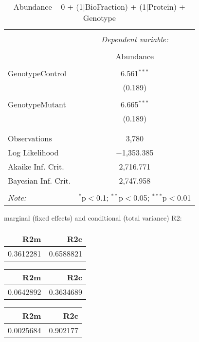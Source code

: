 \documentclass[11pt]{report}
\begin{document}
\begin{table}[!htbp] \centering 
  \caption{Abundance ~ 0 + (1|BioFraction) + (1|Protein) + Genotype} 
  \label{} 
\begin{tabular}{@{\extracolsep{5pt}}lc} 
\\[-1.8ex]\hline 
\hline \\[-1.8ex] 
 & \multicolumn{1}{c}{\textit{Dependent variable:}} \\ 
\cline{2-2} 
\\[-1.8ex] & Abundance \\ 
\hline \\[-1.8ex] 
 GenotypeControl & 6.561$^{***}$ \\ 
  & (0.189) \\ 
  & \\ 
 GenotypeMutant & 6.665$^{***}$ \\ 
  & (0.189) \\ 
  & \\ 
\hline \\[-1.8ex] 
Observations & 3,780 \\ 
Log Likelihood & $-$1,353.385 \\ 
Akaike Inf. Crit. & 2,716.771 \\ 
Bayesian Inf. Crit. & 2,747.958 \\ 
\hline 
\hline \\[-1.8ex] 
\textit{Note:}  & \multicolumn{1}{r}{$^{*}$p$<$0.1; $^{**}$p$<$0.05; $^{***}$p$<$0.01} \\ 
\end{tabular} 
\end{table} 
marginal (fixed effects) and conditional (total variance) R2:

\begin{tabular}{r|r}
\hline
R2m & R2c\\
\hline
0.3612281 & 0.6588821\\
\hline
\end{tabular}

\begin{tabular}{r|r}
\hline
R2m & R2c\\
\hline
0.0642892 & 0.3634689\\
\hline
\end{tabular}

\begin{tabular}{r|r}
\hline
R2m & R2c\\
\hline
0.0025684 & 0.902177\\
\hline
\end{tabular}
\end{document}
